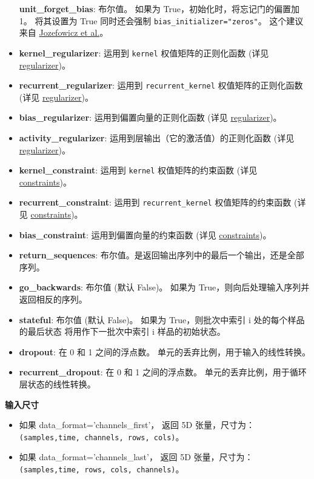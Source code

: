 \begin{itemize}
  \textbf{unit\_forget\_bias}: 布尔值。 如果为
  True，初始化时，将忘记门的偏置加 1。 将其设置为 True 同时还会强制
  \texttt{bias\_initializer="zeros"}。 这个建议来自
  \href{http://www.jmlr.org/proceedings/papers/v37/jozefowicz15.pdf}{Jozefowicz
  et al.}。
\item
  \textbf{kernel\_regularizer}: 运用到 \texttt{kernel}
  权值矩阵的正则化函数 (详见 \hyperref[regularizers]{regularizer})。
\item
  \textbf{recurrent\_regularizer}: 运用到 \texttt{recurrent\_kernel}
  权值矩阵的正则化函数 (详见 \hyperref[regularizers]{regularizer})。
\item
  \textbf{bias\_regularizer}: 运用到偏置向量的正则化函数 (详见
  \hyperref[regularizers]{regularizer})。
\item
  \textbf{activity\_regularizer}: 运用到层输出（它的激活值）的正则化函数
  (详见 \hyperref[regularizers]{regularizer})。
\item
  \textbf{kernel\_constraint}: 运用到 \texttt{kernel} 权值矩阵的约束函数
  (详见 \hyperref[constraints]{constraints})。
\item
  \textbf{recurrent\_constraint}: 运用到 \texttt{recurrent\_kernel}
  权值矩阵的约束函数 (详见 \hyperref[constraints]{constraints})。
\item
  \textbf{bias\_constraint}: 运用到偏置向量的约束函数 (详见
  \hyperref[constraints]{constraints})。
\item
  \textbf{return\_sequences}:
  布尔值。是返回输出序列中的最后一个输出，还是全部序列。
\item
  \textbf{go\_backwards}: 布尔值 (默认 False)。 如果为
  True，则向后处理输入序列并返回相反的序列。
\item
  \textbf{stateful}: 布尔值 (默认 False)。 如果为 True，则批次中索引 i
  处的每个样品的最后状态 将用作下一批次中索引 i 样品的初始状态。
\item
  \textbf{dropout}: 在 0 和 1 之间的浮点数。
  单元的丢弃比例，用于输入的线性转换。
\item
  \textbf{recurrent\_dropout}: 在 0 和 1 之间的浮点数。
  单元的丢弃比例，用于循环层状态的线性转换。
\end{itemize}

\textbf{输入尺寸}

\begin{itemize}
\tightlist
\item
  如果 data\_format='channels\_first'， 返回 5D 张量，尺寸为：
  \texttt{(samples,time,\ channels,\ rows,\ cols)}。
\item
  如果 data\_format='channels\_last'， 返回 5D 张量，尺寸为：
  \texttt{(samples,time,\ rows,\ cols,\ channels)}。
\end{itemize}

